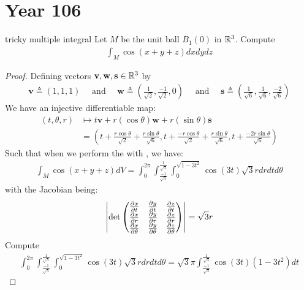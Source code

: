 \documentclass{report}
\begin{document}
\section{Year 106}
\begin{question}{tricky multiple integral}{}
Let $M$ be the unit ball  $B_1(0)$ in $\mathbb{R}^3$. Compute 
 \begin{align*}
\int_M \cos (x+y+z)dxdydz
\end{align*}
\end{question}
\begin{proof}
Defining vectors $\textbf{v},\textbf{w},\textbf{s}\in\mathbb{R}^3$ by 
\begin{align*}
\textbf{v}\triangleq (1,1,1)\quad \text{ and }\quad  \textbf{w}\triangleq \left( \frac{1}{\sqrt{2} }, \frac{-1}{\sqrt{2} },0 \right)\quad  \text{ and } \quad \textbf{s}\triangleq \left(\frac{1}{\sqrt{6}},\frac{1}{\sqrt{6}},\frac{-2}{\sqrt{6} } \right) 
\end{align*}
We have an injective differentiable map: 
\begin{align*}
(t,\theta ,r)&\mapsto  t\textbf{v}+ r (\cos \theta) \textbf{w}+ r \left(\sin \theta \right) \textbf{s} \\
&= \left( t+ \frac{r\cos \theta}{\sqrt{2} } + \frac{r\sin \theta}{\sqrt{6} }, t+ \frac{- r \cos \theta}{\sqrt{2} }+ \frac{r \sin \theta}{\sqrt{6} }, t + \frac{-2 r \sin \theta}{\sqrt{6} } \right)
\end{align*} 
Such that when we perform the  with , we have: 
\begin{align*}
\int_M \cos (x+y+z) dV= \int_0^{2\pi } \int^{\frac{1}{\sqrt{3} }}_{\frac{-1}{\sqrt{3} }} \int_0^{\sqrt{1-3t^2} } \cos (3t) \sqrt{3}r dr dt d\theta  
\end{align*}
with the Jacobian being: 
\begin{align*}
\left|\operatorname{det} \begin{pmatrix} 
      \frac{\partial x}{\partial t} & \frac{\partial y}{\partial t} & \frac{\partial z}{\partial t} \\
      \frac{\partial x}{\partial r} & \frac{\partial y}{\partial r} & \frac{\partial z}{\partial r} \\
      \frac{\partial x}{\partial \theta} & \frac{\partial y}{\partial \theta} & \frac{\partial z}{\partial \theta}
\end{pmatrix}\right| = \sqrt{3} r 
\end{align*}
Compute
\begin{align*}
 \int_0^{2\pi } \int^{\frac{1}{\sqrt{3} }}_{\frac{-1}{\sqrt{3} }} \int_0^{\sqrt{1-3t^2} } \cos (3t) \sqrt{3}r dr dt d\theta   = \sqrt{3} \pi  \int^{\frac{1}{\sqrt{3} }}_{\frac{-1}{\sqrt{3} }} \cos (3t) (1-3t^2) dt

\end{align*}
\end{proof}
\end{document}
